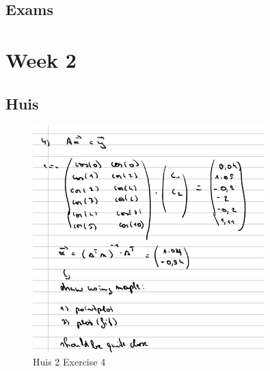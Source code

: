 \documentclass[a4paper]{report}
\begin{document}


\subsection{Exams}



\section{Week 2}

\subsection{Huis}

\begin{figure}[H]
	\centering
	\includegraphics[width=0.8\textwidth]{images/huis_2_4.png}
	\caption{Huis 2 Exercise 4}
	\label{fig:huis_2_ex_4}
\end{figure}
\end{document}
